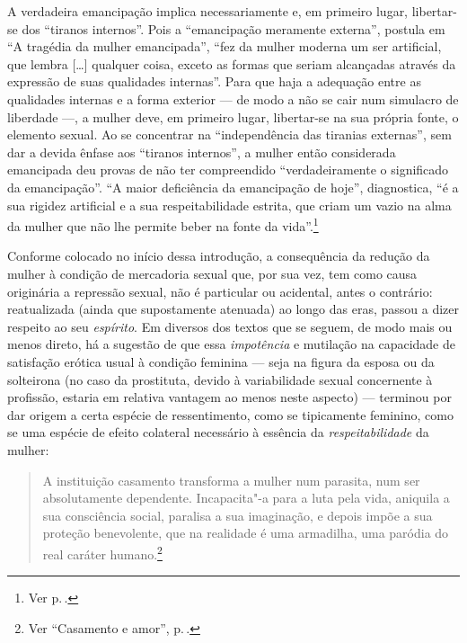 A verdadeira emancipação implica necessariamente e, em primeiro lugar,
libertar-se dos ``tiranos internos''. Pois a ``emancipação meramente
externa'', postula em ``A tragédia da mulher emancipada'', ``fez da
mulher moderna um ser artificial, que lembra {[}\ldots{]} qualquer coisa,
exceto as formas que seriam alcançadas através da expressão de suas
qualidades internas''. Para que haja a adequação entre as qualidades
internas e a forma exterior --- de modo a não se cair num simulacro de
liberdade ---, a mulher deve, em primeiro lugar, libertar-se na sua
própria fonte, o elemento sexual. Ao se concentrar na ``independência
das tiranias externas'', sem dar a devida ênfase aos ``tiranos
internos'', a mulher então considerada emancipada deu
provas de não ter compreendido ``verdadeiramente o significado da
emancipação''. ``A maior deficiência da emancipação de hoje'',
diagnostica, ``é a sua rigidez artificial e a sua respeitabilidade
estrita, que criam um vazio na alma da mulher que não lhe permite beber
na fonte da vida''.\footnote{Ver p.\,\pageref{mae}.}

Conforme colocado no início dessa introdução, a consequência da
redução da mulher à condição de mercadoria sexual que, por sua vez, tem
como causa originária a repressão sexual, não é particular ou acidental,
antes o contrário: reatualizada (ainda que supostamente atenuada) ao
longo das eras, passou a dizer respeito ao seu \textit{espírito}. Em diversos
dos textos que se seguem, de modo mais ou menos direto, há a sugestão de
que essa \textit{impotência} e mutilação na capacidade de satisfação erótica
usual à condição feminina --- seja na figura da esposa ou da solteirona
(no caso da prostituta, devido à variabilidade sexual concernente à
profissão, estaria em relativa vantagem ao menos neste aspecto) ---
terminou por dar origem a certa espécie de ressentimento, como se
tipicamente feminino, como se uma espécie de efeito colateral necessário
à essência da \textit{respeitabilidade} da mulher:

\begin{quote}
A instituição casamento transforma a mulher num parasita, num ser
absolutamente dependente. Incapacita"-a para a luta pela vida, aniquila a
sua consciência social, paralisa a sua imaginação, e depois impõe a sua
proteção benevolente, que na realidade é uma armadilha, uma paródia do
real caráter humano.\footnote{Ver ``Casamento e amor'', p.\,\pageref{parasita}.}
\end{quote}

